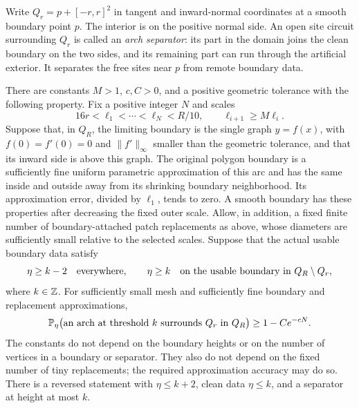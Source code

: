 Write $Q_r=p+[-r,r]^2$ in tangent and inward-normal coordinates at a smooth
boundary point $p$.  The interior is on the positive normal side.
An open site circuit surrounding $Q_r$ is called an \emph{arch separator}:
its part in the domain joins the clean boundary on the two sides, and its
remaining part can run through the artificial exterior.  It separates the
free sites near $p$ from remote boundary data.

\begin{theorem}\label{thm:boundary-arches}
There are constants $M>1$, $c,C>0$, and a positive geometric tolerance with
the following property.  Fix a positive integer $N$ and scales
\begin{equation}\label{eq:arch-scales}
  16r<\ell_1<\cdots<\ell_N<R/10,
  \qquad \ell_{i+1}\ge M\ell_i.
\end{equation}
Suppose that, in $Q_R$, the limiting boundary is the single graph
$y=f(x)$, with $f(0)=f'(0)=0$ and $\|f'\|_\infty$ smaller than the
geometric tolerance, and that its inward side is above this graph.  The
original polygon boundary is a sufficiently fine uniform parametric
approximation of this arc and has the same inside and outside away from
its shrinking boundary neighborhood.  Its approximation error, divided by
$\ell_1$, tends to zero.  A smooth boundary has these properties after
decreasing the fixed outer scale.
Allow, in addition, a fixed finite number of boundary-attached patch
replacements as above, whose diameters are sufficiently small relative to
the selected scales.  Suppose that the actual usable boundary data satisfy
\begin{equation}\label{eq:arch-boundary-data}
 \eta\ge k-2\quad\hbox{everywhere},
 \qquad
 \eta\ge k\quad\hbox{on the usable boundary in }Q_R\setminus Q_r,
\end{equation}
where $k\in\mathbb Z$.  For sufficiently small mesh and sufficiently fine boundary
and replacement approximations,
\begin{equation}\label{eq:arch-high-probability}
 \mathbb P_\eta\bigl(\text{an arch at threshold }k\text{ surrounds }Q_r
       \text{ in }Q_R\bigr)\ge 1-Ce^{-cN}.
\end{equation}
The constants do not depend on the boundary heights or on the number of
vertices in a boundary or separator.  They also do not depend on the fixed
number of tiny replacements; the required approximation accuracy may do so.
There is a reversed statement with $\eta\le k+2$, clean data $\eta\le k$,
and a separator at height at most $k$.
\end{theorem}

